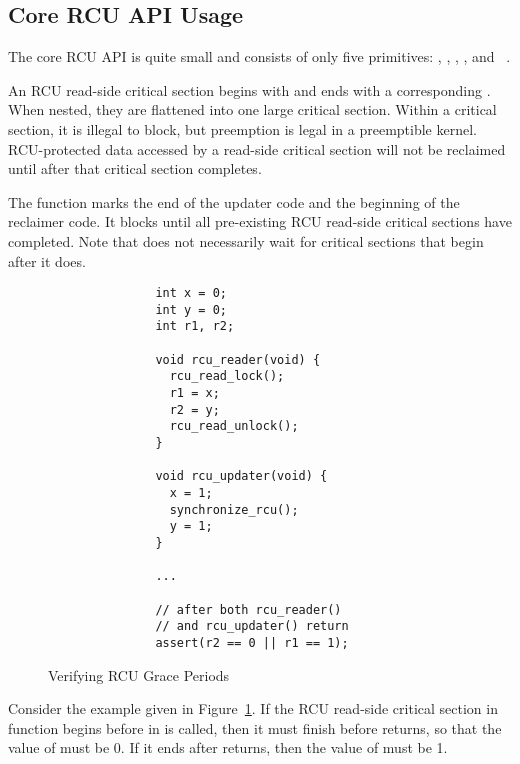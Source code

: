 \subsection{Core RCU API Usage} \label{sec:api_usage}
The core RCU API is quite small and consists of only five primitives:
, , ,
, and ~\cite{McKenneyOSR08}.

An RCU read-side critical section begins with 
and ends with a corresponding .
When nested, they are flattened into one large critical section.
Within a critical section, it is illegal to block, but
preemption is legal in a preemptible kernel.
RCU-protected data accessed by a 
read-side critical section will not be reclaimed until after that
critical section completes.

The function  marks the end of the updater code and 
the beginning of the reclaimer code. It blocks until all pre-existing RCU
read-side critical sections have completed. Note that  
does not necessarily wait for critical sections that begin after
it does.


\begin{figure}[tbp]
\centering
\footnotesize
\begin{verbatim}
               int x = 0;
               int y = 0;
               int r1, r2;
               
               void rcu_reader(void) {
                 rcu_read_lock();
                 r1 = x; 
                 r2 = y; 
                 rcu_read_unlock();
               }
               
               void rcu_updater(void) {
                 x = 1; 
                 synchronize_rcu();
                 y = 1; 
               }

               ...

               // after both rcu_reader() 
               // and rcu_updater() return
               assert(r2 == 0 || r1 == 1);
\end{verbatim}
\caption{Verifying RCU Grace Periods}
\label{fig:verify_rcu_gp}
\end{figure}

Consider the example given in
Figure~\ref{fig:verify_rcu_gp}.
If the RCU read-side critical section in function  begins
before  in  is called, then it must 
finish before  returns, so that the value of
 must be 0. If it ends after  returns, then 
the value of  must be 1.

